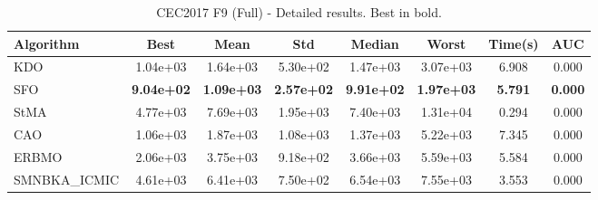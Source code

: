 \begin{table}[H]
\centering\small
\caption{CEC2017 F9 (Full) - Detailed results. Best in bold.}
\label{tab:cec2017_F9}
\begin{tabular}{lccccccc}
\toprule
\textbf{Algorithm} & \textbf{Best} & \textbf{Mean} & \textbf{Std} & \textbf{Median} & \textbf{Worst} & \textbf{Time(s)} & \textbf{AUC} \\
\midrule
KDO & 1.04e+03 & 1.64e+03 & 5.30e+02 & 1.47e+03 & 3.07e+03 & 6.908 & 0.000 \\
SFO & \textbf{9.04e+02} & \textbf{1.09e+03} & \textbf{2.57e+02} & \textbf{9.91e+02} & \textbf{1.97e+03} & \textbf{5.791} & \textbf{0.000} \\
StMA & 4.77e+03 & 7.69e+03 & 1.95e+03 & 7.40e+03 & 1.31e+04 & 0.294 & 0.000 \\
CAO & 1.06e+03 & 1.87e+03 & 1.08e+03 & 1.37e+03 & 5.22e+03 & 7.345 & 0.000 \\
ERBMO & 2.06e+03 & 3.75e+03 & 9.18e+02 & 3.66e+03 & 5.59e+03 & 5.584 & 0.000 \\
SMNBKA_ICMIC & 4.61e+03 & 6.41e+03 & 7.50e+02 & 6.54e+03 & 7.55e+03 & 3.553 & 0.000 \\
\bottomrule
\end{tabular}
\end{table}
